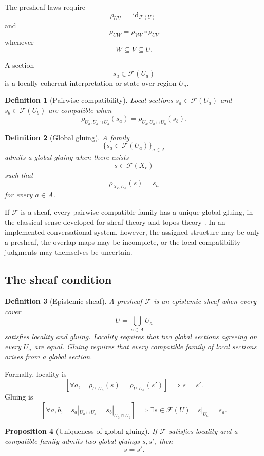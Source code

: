 \documentclass[11pt]{article}
\newtheorem{definition}{Definition}[section]
\newtheorem{proposition}[definition]{Proposition}
\theoremstyle{definition}
\begin{document}
The presheaf laws require
\[
\rho_{UU}
=
\operatorname{id}_{\mathscr F(U)}
\]
and
\[
\rho_{UW}
=
\rho_{VW}\circ\rho_{UV}
\]
whenever
\[
W\subseteq V\subseteq U.
\]

A section
\[
s_a\in\mathscr F(U_a)
\]
is a locally coherent interpretation or state over region \(U_a\).

\begin{definition}[Pairwise compatibility]
Local sections \(s_a\in\mathscr F(U_a)\) and \(s_b\in\mathscr F(U_b)\) are compatible when
\[
\rho_{U_a,U_a\cap U_b}(s_a)
=
\rho_{U_b,U_a\cap U_b}(s_b).
\]
\end{definition}

\begin{definition}[Global gluing]
A family
\[
\{s_a\in\mathscr F(U_a)\}_{a\in A}
\]
admits a global gluing when there exists
\[
s\in\mathscr F(X_c)
\]
such that
\[
\rho_{X_c,U_a}(s)=s_a
\]
for every \(a\in A\).
\end{definition}

If \(\mathscr F\) is a sheaf, every pairwise-compatible family has a unique global gluing, in the classical sense developed for sheaf theory and topos theory \cite{godement1958,maclane1992,curry2014}. In an implemented conversational system, however, the assigned structure may be only a presheaf, the overlap maps may be incomplete, or the local compatibility judgments may themselves be uncertain.

\subsection{The sheaf condition}

\begin{definition}[Epistemic sheaf]
A presheaf \(\mathscr F\) is an epistemic sheaf when every cover
\[
U=\bigcup_{a\in A}U_a
\]
satisfies locality and gluing. Locality requires that two global sections agreeing on every \(U_a\) are equal. Gluing requires that every compatible family of local sections arises from a global section.
\end{definition}

Formally, locality is
\[
\left[
\forall a,
\quad
\rho_{U,U_a}(s)
=
\rho_{U,U_a}(s')
\right]
\implies
s=s'.
\]
Gluing is
\[
\left[
\forall a,b,
\quad
s_a|_{U_a\cap U_b}
=
s_b|_{U_a\cap U_b}
\right]
\implies
\exists s\in\mathscr F(U)
\quad
s|_{U_a}=s_a.
\]

\begin{proposition}[Uniqueness of global gluing]
If \(\mathscr F\) satisfies locality and a compatible family admits two global gluings \(s,s'\), then
\[
s=s'.
\]
\end{proposition}
\end{document}
